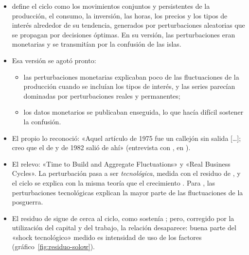 \documentclass[11pt]{article}
\begin{document}
\begin{itemize}
\item \textcite{Lucas1975Equilibrium,Lucas1977Understanding} define el ciclo como los movimientos conjuntos y persistentes de la producción, el consumo, la inversión, las horas, los precios y los tipos de interés alrededor de su tendencia, generados por perturbaciones aleatorias que se propagan por decisiones óptimas. En su versión, las perturbaciones eran monetarias y se transmitían por la confusión de las islas.
\item Esa versión se agotó pronto:
  \begin{itemize}
  \item las perturbaciones monetarias explicaban poco de las fluctuaciones de la producción cuando se incluían los tipos de interés\nocite{Sims1980Comparison}, y las series parecían dominadas por perturbaciones reales y permanentes\nocite{NelsonPlosser1982Trends};
  \item los datos monetarios se publicaban enseguida, lo que hacía difícil sostener la confusión.
  \end{itemize}
\item El propio  lo reconoció: «Aquel artículo de 1975 fue un callejón sin salida […]; creo que el de  y  de 1982 salió de ahí» (entrevista con , en \textcite[181]{Usabiaga1999Lucas})\nocite{DeVroey2010Lucas}.
\item El relevo: «Time to Build and Aggregate Fluctuations»\nocite{KydlandPrescott1982Time} y «Real Business Cycles»\nocite{LongPlosser1983Real}. La perturbación pasa a ser \emph{tecnológica}, medida con el residuo de  , y el ciclo se explica con la misma teoría que el crecimiento . Para , las perturbaciones tecnológicas explican la mayor parte de las fluctuaciones de la posguerra.
\item El residuo de  sigue de cerca al ciclo, como sostenía \textcite{Prescott1986}; pero, corregido por la utilización del capital y del trabajo, la relación desaparece: buena parte del «shock tecnológico» medido es intensidad de uso de los factores (gráfico~\ref{fig:residuo-solow})\nocite{Fernald2026TFP,BasuFernaldKimball2006Are}.
\end{itemize}
\end{document}
